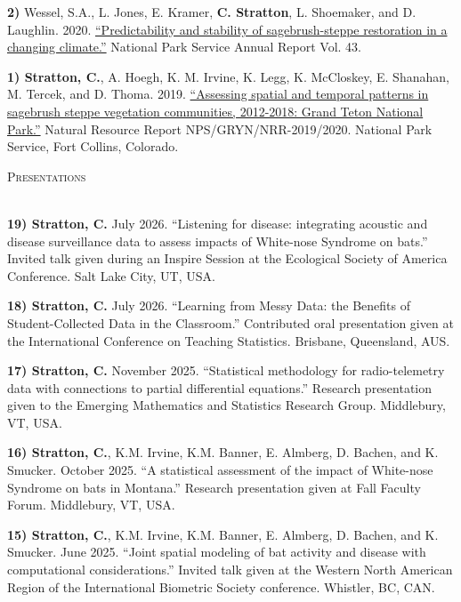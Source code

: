 \documentclass[a4paper]{article}
\newcommand{\lineunder} {
	\vspace*{-8pt} \\
	\hspace*{-18pt} \hrulefill \\
}
\newcommand{\header} [1] {
	{\hspace*{-18pt}\vspace*{6pt} \textcolor{Cerulean}{\textsc{#1}}}
	\vspace*{-6pt} \textcolor{Cerulean}{\lineunder}
}
\begin{document}
\textbf{2)} Wessel, S.A., L. Jones, E. Kramer, \textbf{C. Stratton}, L.
Shoemaker, and D. Laughlin. 2020.
\href{https://journals.uwyo.edu/index.php/uwnpsrc/article/view/6791/6301}{``Predictability
and stability of sagebrush-steppe restoration in a changing climate.''}
National Park Service Annual Report Vol. 43. \vspace*{2mm}

\textbf{1) Stratton, C.}, A. Hoegh, K. M. Irvine, K. Legg, K. McCloskey,
E. Shanahan, M. Tercek, and D. Thoma. 2019.
\href{https://irma.nps.gov/DataStore/DownloadFile/631136}{``Assessing
spatial and temporal patterns in sagebrush steppe vegetation
communities, 2012-2018: Grand Teton National Park.''} Natural Resource
Report NPS/GRYN/NRR-2019/2020. National Park Service, Fort Collins,
Colorado. \vspace*{2mm}

\header{Presentations}
\vspace*{2mm}

\textbf{19) Stratton, C.} July 2026. ``Listening for disease:
integrating acoustic and disease surveillance data to assess impacts of
White-nose Syndrome on bats.'' Invited talk given during an Inspire
Session at the Ecological Society of America Conference. Salt Lake City,
UT, USA. \vspace*{2mm}

\textbf{18) Stratton, C.} July 2026. ``Learning from Messy Data: the
Benefits of Student-Collected Data in the Classroom.'' Contributed oral
presentation given at the International Conference on Teaching
Statistics. Brisbane, Queensland, AUS. \vspace*{2mm}

\textbf{17) Stratton, C.} November 2025. ``Statistical methodology for
radio-telemetry data with connections to partial differential
equations.'' Research presentation given to the Emerging Mathematics and
Statistics Research Group. Middlebury, VT, USA. \vspace*{2mm}

\textbf{16) Stratton, C.}, K.M. Irvine, K.M. Banner, E. Almberg, D.
Bachen, and K. Smucker. October 2025. ``A statistical assessment of the
impact of White-nose Syndrome on bats in Montana.'' Research
presentation given at Fall Faculty Forum. Middlebury, VT, USA.
\vspace*{2mm}

\textbf{15) Stratton, C.}, K.M. Irvine, K.M. Banner, E. Almberg, D.
Bachen, and K. Smucker. June 2025. ``Joint spatial modeling of bat
activity and disease with computational considerations.'' Invited talk
given at the Western North American Region of the International
Biometric Society conference. Whistler, BC, CAN. \vspace*{2mm}
\end{document}
